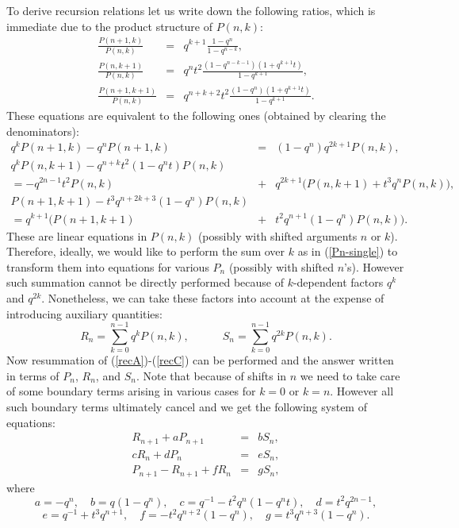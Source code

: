 \documentclass[hyper,letterpaper]{JHEP3}
\newcommand{\bea}{\begin{eqnarray}}
\newcommand{\eea}{\end{eqnarray}}
\newcommand{\be}{\begin{equation}}
\newcommand{\ee}{\end{equation}}
\begin{document}
To derive recursion relations let us write down the following ratios, which is immediate due to the product structure of $P(n,k)$:
\bea
\frac{P(n+1,k)}{P(n,k)} & = & q^{k+1} \frac{1-q^n}{1-q^{n-k}}, \label{ratioA}\\
\frac{P(n,k+1)}{P(n,k)} & = & q^{n} t^2 \frac{(1-q^{n-k-1})(1+q^{k+1}t)}{1-q^{k+1}}, \label{ratioB}  \\
\frac{P(n+1,k+1)}{P(n,k)} & = & q^{n+k+2} t^2 \frac{(1-q^n)(1+q^{k+1}t)}{1-q^{k+1}}.
  \label{ratioC}  \eea
These equations are equivalent to the following ones (obtained by clearing the denominators):
\begin{eqnarray}
q^k P(n+1,k) - q^n P(n+1,k) & = & (1-q^n) q^{2k+1} P(n,k),   \label{recA} \\
q^k P(n,k+1) - q^{n+k} t^2 (1 - q^n t) P(n,k) &  & \nonumber \\
= -q^{2n-1} t^2 P(n,k) &  + & q^{2k+1}\Big(P(n,k+1) + t^3 q^n P(n,k)  \Big), \label{recB} \\
P(n+1,k+1) - t^3 q^{n+2k+3} (1 - q^n) P(n,k) &  &  \nonumber \\
= q^{k+1} \Big(P(n+1,k+1) & + & t^2 q^{n+1}(1-q^n) P(n,k)  \Big).    \label{recC}
\end{eqnarray}
These are linear equations in $P(n,k)$ (possibly with shifted arguments
$n$ or $k$). Therefore, ideally, we would like to perform the sum over
$k$ as in (\ref{Pn-single}) to transform them into equations for various
$P_n$ (possibly with shifted $n$'s). However such summation cannot be
directly performed because of $k$-dependent factors $q^k$ and
$q^{2k}$. Nonetheless, we can take these factors into account at the
expense of introducing auxiliary quantities:
\be
R_n = \sum_{k=0}^{n-1} q^k P(n,k),   \quad \qquad S_n  = \sum_{k=0}^{n-1} q^{2k} P(n,k).    \label{RnSn}
\ee
Now resummation of (\ref{recA})-(\ref{recC}) can be performed and the answer written in terms of $P_n$, $R_n$, and $S_n$. Note that because of shifts in $n$ we need to take care of some boundary terms arising in various cases for $k=0$ or $k=n$. However all such boundary terms ultimately cancel and we get the following system of equations:
\bea
R_{n+1} + a P_{n+1} & = & b S_n,   \label{recAbis} \\
c R_n + d P_n & = & e S_n, \label{recBbis} \\
P_{n+1} - R_{n+1} + f R_n & = & g S_n,   \label{recCbis}
\eea
where
\be
a = -q^n, \quad b = q(1-q^n), \quad c = q^{-1} - t^2q^n(1-q^n t),\quad d = t^2 q^{2n-1},
\ee
$$
e = q^{-1} + t^3 q^{n+1},\quad f = -t^2 q^{n+2} (1-q^n), \quad g = t^3 q^{n+3} (1-q^n).
$$
\end{document}
